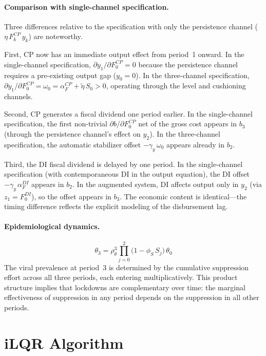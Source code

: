 \documentclass[12pt, a4paper]{article}
\begin{document}
\paragraph{Comparison with single-channel specification.}
Three differences relative to the specification with only the persistence
channel ($\eta\, F_k^{CP}\, y_k$) are noteworthy.

First, CP now has an immediate output effect from period~1 onward. In the
single-channel specification, $\partial y_1 / \partial F_0^{CP} = 0$ because
the persistence channel requires a pre-existing output gap ($y_0 = 0$).
In the three-channel specification,
$\partial y_1 / \partial F_0^{CP} = \omega_0 =
\alpha_F^{CP} + \tilde{\eta}\, S_0 > 0$, operating through the level and
cushioning channels.

Second, CP generates a fiscal dividend one period earlier. In the
single-channel specification, the first non-trivial
$\partial b / \partial F_0^{CP}$ net of the gross cost appears in $b_3$
(through the persistence channel's effect on $y_2$). In the three-channel
specification, the automatic stabilizer offset
$-\gamma_y\, \omega_0$ appears already in $b_2$.

Third, the DI fiscal dividend is delayed by one period. In the single-channel
specification (with contemporaneous DI in the output equation), the DI
offset $-\gamma_y\, \alpha_F^{DI}$ appears in $b_2$. In the augmented system,
DI affects output only in $y_2$ (via $z_1 = F_0^{DI}$), so the offset
appears in $b_3$. The economic content is identical---the timing difference
reflects the explicit modeling of the disbursement lag.

\paragraph{Epidemiological dynamics.}
%
\begin{equation}
    \theta_3 = \rho_\theta^3\prod_{j=0}^{2}
    \bigl(1 - \phi_S\, S_j\bigr)\, \theta_0
    \label{eq:theta3_corr}
\end{equation}
%
The viral prevalence at period~3 is determined by the cumulative suppression
effort across all three periods, each entering multiplicatively. This product
structure implies that lockdowns are complementary over time: the marginal
effectiveness of suppression in any period depends on the suppression in all
other periods.

\section{iLQR Algorithm}
\label{app:ilqr}
\end{document}
